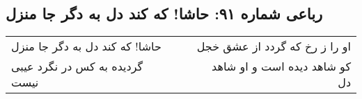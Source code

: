\begin{center}
\section*{رباعی شماره ۹۱: حاشا! که کند دل به دگر جا منزل}
\label{sec:091}
\begin{longtable}{l p{0.5cm} r}
حاشا! که کند دل به دگر جا منزل
&&
او را ز رخ که گردد از عشق خجل
\\
گردیده به کس در نگرد عیبی نیست
&&
کو شاهد دیده است و او شاهد دل
\\
\end{longtable}
\end{center}
